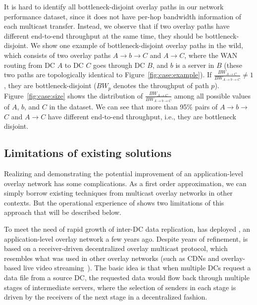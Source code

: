 It is hard to identify all bottleneck-disjoint overlay paths in our
network performance dataset, since it does not have per-hop bandwidth information of each
multicast transfer.
Instead, we observe that if two overlay paths have different end-to-end 
throughput at the same time, they should be bottleneck-disjoint.
We show one example of bottleneck-disjoint overlay paths in the wild, 
which consists of two overlay paths $A$$\rightarrow$$b$$\rightarrow$$C$ 
and $A$$\rightarrow$$C$, where the WAN routing from DC $A$ to DC $C$ goes
through DC $B$, and $b$ is a server in $B$ (these two paths are 
topologically identical to Figure~\ref{fig:case:example}).
If $\frac{BW_{A\rightarrow C}}{BW_{A\rightarrow b\rightarrow C}}\neq1$,
they are bottleneck-disjoint ($BW_p$ denotes the throughput of path $p$).
Figure~\ref{fig:case:size} shows the distribution of
$\frac{BW_{A\rightarrow C}}{BW_{A\rightarrow b\rightarrow C}}$
among all possible values of $A$, $b$, and $C$ in the dataset.
We can see that more than 95\% pairs of $A$$\rightarrow$$b$$\rightarrow$$C$ 
and $A$$\rightarrow$$C$ have different end-to-end throughput, i.e., 
they are bottleneck disjoint.


\subsection{Limitations of existing solutions}
\label{subsec:motivation:baseline}

Realizing and demonstrating the potential improvement of an application-level 
overlay network has some complications. As a first order approximation, we can 
simply borrow existing techniques from multicast overlay networks 
in other contexts. But the operational experience of \company shows
two limitations of this approach that will be described below.

To meet the need of rapid growth of inter-DC data replication, 
\company has deployed \alg, an application-level overlay network a few 
years ago. Despite years of refinement, \alg is based on a 
receiver-driven decentralized overlay multicast protocol, which
resembles what was used in other overlay networks (such as CDNs and 
overlay-based live video 
streaming~\cite{Andreev2013Designing,sripanidkulchai2004analysis,zhang2005coolstreaming}).
The basic idea is that when multiple DCs request a data file from 
a source DC, the requested data would flow back through multiple 
stages of intermediate servers,  where the selection of senders in 
each stage is driven by the receivers of the next stage in a 
decentralized fashion.

